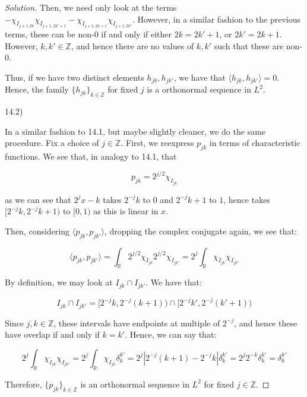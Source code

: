 \documentclass[10pt]{article}
\begin{document}
\begin{proof}[Solution]
Then, we need only look at the terms $ - \chi_{I_{j+1, 2k}} \chi_{I_{j+1, 2k'+1}} - \chi_{I_{j+1, 2k+1}} \chi_{I_{j+1, 2k'}}$. However, in a similar fashion to the previous terms, these can be non-0 if and only if either $2k = 2k' + 1$, or $2k' = 2k + 1$. However, $k, k' \in \mathbb{Z}$, and hence there are no values of $k, k'$ such that these are non-0.

Thus, if we have two distinct elements $h_{jk}, h_{jk'}$, we have that  $\langle h_{jk}, h_{jk'} \rangle = 0$. Hence, the family $\{ h_{jk} \}_{k \in \mathbb{Z}}$ for fixed $j$ is a orthonormal sequence in $L^2$.

14.2)

In a similar fashion to 14.1, but maybe slightly cleaner, we do the same procedure. Fix a choice of $j \in \mathbb{Z}$. First, we reexpress $p_{jk}$ in terms of characteristic functions. We see that, in analogy to 14.1, that

$$  p_{jk} = 2^{j/2} \chi_{I_{jk}} $$

as we can see that $2^j x - k$ takes $2^{-j}k$ to $0$ and $2^{-j} k+1$ to $1$, hence takes $[2^{-j}k, 2^{-j}k+1)$ to $[0,1)$ as this is linear in $x$. 

Then, considering $\langle p_{jk}, p_{jk'} \rangle$, dropping the complex conjugate again, we see that:

$$ \langle p_{jk}, p_{jk'} \rangle = \int_{\mathbb{R}} 2^{j/2}  \chi_{I_{jk}} 2^{j/2}  \chi_{I_{jk'}} = 2^{j} \int_\mathbb{R}  \chi_{I_{jk}}  \chi_{I_{jk'}}$$

By definition, we may look at $I_{jk} \cap I_{jk'}$. We have that:

$$ I_{jk} \cap I_{jk'} =  [2^{-j}k, 2^{-j}(k+1)) \cap  [2^{-j}k', 2^{-j}(k'+1))$$

Since $j, k \in \mathbb{Z}$, these intervals have endpoints at multiple of $2^{-j}$, and hence these have overlap if and only if $k = k'$. Hence, we can say that:

$$ 2^{j} \int_\mathbb{R}  \chi_{I_{jk}}  \chi_{I_{jk'}} = 2^{j} \int_\mathbb{R}  \chi_{I_{jk}}  \delta_k^{k'} = 2^j | 2^{-j}(k+1) - 2^{-j} k| \delta_k^{k'} = 2^j 2^{-k} \delta_k^{k'} = \delta_k^{k'} $$

Therefore, $\{ p_{jk} \}_{k \in \mathbb{Z}}$ is an orthonormal sequence in $L^2$ for fixed $j \in \mathbb{Z}$. 

\end{proof}
\end{document}
